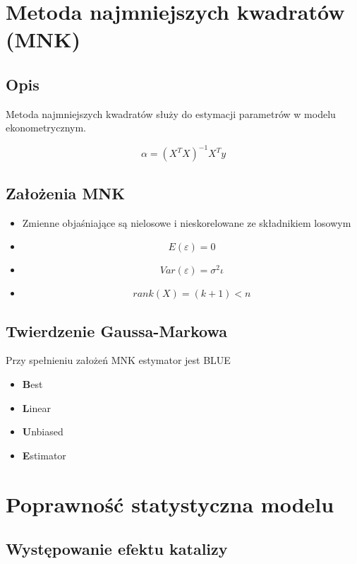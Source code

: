 \section{Metoda najmniejszych kwadratów (MNK)}\label{sec:mnk}

\subsection{Opis}\label{subsec:opis}
Metoda najmniejszych kwadratów służy do estymacji parametrów w modelu ekonometrycznym.

\[ \alpha = (X^{T}X)^{-1}X^{T}y \]

\subsection{Założenia MNK}\label{subsec:założenia-mnk}

\begin{itemize}
    \item Zmienne objaśniające są nielosowe i nieskorelowane ze składnikiem losowym
    \item \[E(\varepsilon) = 0\]
    \item \[Var(\varepsilon) = \sigma^2 \iota\]
    \item \[rank(X) = (k+1) <n\]
\end{itemize}

\subsection{Twierdzenie Gaussa-Markowa}\label{subsec:twierdzenie-gaussa-markowa}
Przy spełnieniu założeń MNK estymator jest BLUE
\begin{itemize}
    \item \textbf{B}est
    \item \textbf{L}inear
    \item \textbf{U}nbiased
    \item \textbf{E}stimator
\end{itemize}

\section {Poprawność statystyczna modelu}\label{sec:poprawność-statystyczna-modelu}

\subsection{Występowanie efektu katalizy}\label{subsec:występowanie-efektu-katalizy}

